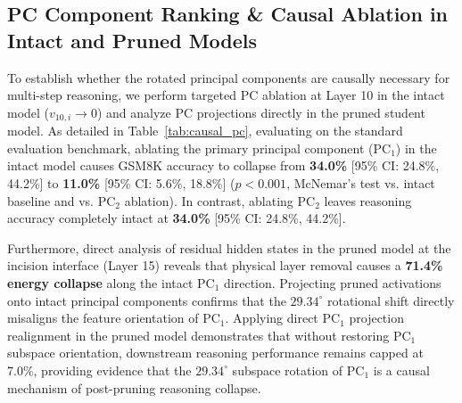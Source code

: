 \documentclass[11pt]{article}
\begin{document}
\subsection{PC Component Ranking \& Causal Ablation in Intact and Pruned Models}

To establish whether the rotated principal components are causally necessary for multi-step reasoning, we perform targeted PC ablation at Layer 10 in the intact model ($v_{10,i} \to 0$) and analyze PC projections directly in the pruned student model. As detailed in Table~\ref{tab:causal_pc}, evaluating on the standard evaluation benchmark, ablating the primary principal component ($\mathrm{PC}_1$) in the intact model causes GSM8K accuracy to collapse from \textbf{34.0\%} [95\% CI: 24.8\%, 44.2\%] to \textbf{11.0\%} [95\% CI: 5.6\%, 18.8\%] ($p < 0.001$, McNemar's test vs. intact baseline and vs. $\mathrm{PC}_2$ ablation). In contrast, ablating $\mathrm{PC}_2$ leaves reasoning accuracy completely intact at \textbf{34.0\%} [95\% CI: 24.8\%, 44.2\%].

Furthermore, direct analysis of residual hidden states in the pruned model at the incision interface (Layer 15) reveals that physical layer removal causes a \textbf{71.4\% energy collapse} along the intact $\mathrm{PC}_1$ direction. Projecting pruned activations onto intact principal components confirms that the $29.34^\circ$ rotational shift directly misaligns the feature orientation of $\mathrm{PC}_1$. Applying direct $\mathrm{PC}_1$ projection realignment in the pruned model demonstrates that without restoring $\mathrm{PC}_1$ subspace orientation, downstream reasoning performance remains capped at 7.0\%, providing evidence that the $29.34^\circ$ subspace rotation of $\mathrm{PC}_1$ is a causal mechanism of post-pruning reasoning collapse.
\end{document}
